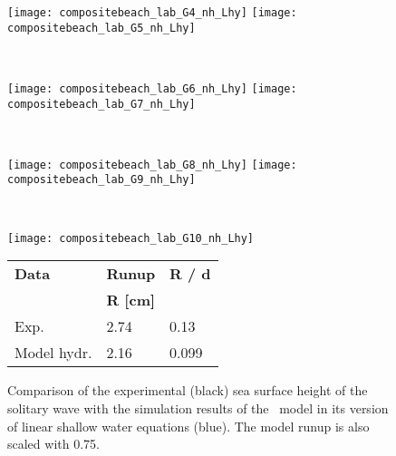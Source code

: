 \begin{figure}[htbp]
\begin{minipage}{\textwidth}
\texttt{[image: compositebeach\_lab\_G4\_nh\_Lhy]}
\texttt{[image: compositebeach\_lab\_G5\_nh\_Lhy]}
\end{minipage} \\
\begin{minipage}{\textwidth}
\texttt{[image: compositebeach\_lab\_G6\_nh\_Lhy]}
\texttt{[image: compositebeach\_lab\_G7\_nh\_Lhy]}
\end{minipage} \\
\begin{minipage}{\textwidth}
\texttt{[image: compositebeach\_lab\_G8\_nh\_Lhy]}
\texttt{[image: compositebeach\_lab\_G9\_nh\_Lhy]}
\end{minipage} \\
\begin{minipage}{0.48\textwidth}
\texttt{[image: compositebeach\_lab\_G10\_nh\_Lhy]}
\end{minipage} 
\begin{minipage}{0.45\textwidth}
\begin{tabular}{lll}
\textbf{Data} & \textbf{Runup} & \textbf{R / d} \\
              & \textbf{R [cm]} &  \\
\toprule
Exp.  &  2.74   &  0.13 \\
Model hydr. &  2.16   &  0.099 \\
\end{tabular}
\end{minipage}
\caption{Comparison of the experimental (black) sea surface height of the
solitary wave with the simulation results of the \nh\ model in its version of linear shallow water equations (blue). The model runup is also scaled with 0.75.}
\label{fig:nh_compositebeach_lab_nh_Lhy}
\end{figure}



